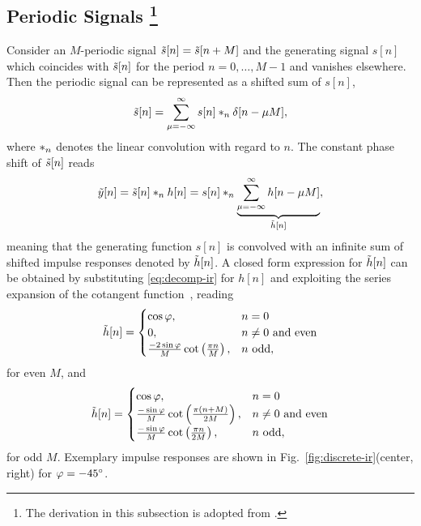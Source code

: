 \subsection[Periodic Signals]{Periodic Signals%
\footnote{The derivation in this subsection is adopted from
\cite[Sec.~1.9 and Sec.~4.6]{hahn1996hilbert}.}}
\label{sec:periodic-signals}
%
Consider an $M$-periodic signal $\tilde{s}[n] = \tilde{s}[n + M]$
and the generating signal $s[n]$ which coincides
with $\tilde{s}[n]$ for the period $n=0,\ldots,M\!-\!1$ and vanishes elsewhere.
Then the periodic signal can be represented as a shifted sum of $s[n]$,
\begin{align}
\speri[n] = \sum_{\mu=-\infty}^{\infty} s[n] \convn \delta[n-\mu M],
\label{eq:periodic-rep}
\end{align}
where $\ast_{n}$ denotes the linear convolution with regard to $n$.
The constant phase shift of $\tilde{s}[n]$ reads
\begin{align}
\yperi[n] = \speri[n] \convn h[n]
= s[n] \convn
\underbrace{\sum_{\mu=-\infty}^{\infty} h[n-\mu M]}_{\hperi[n]},
\label{eq:periodic-conv}
\end{align}
meaning that the generating function $s[n]$ is convolved with
an infinite sum of shifted impulse responses denoted by $\tilde{h}[n]$.
A closed form expression for $\tilde{h}[n]$ can be obtained by
substituting \eqref{eq:decomp-ir} for $h[n]$ and exploiting
the series expansion of the cotangent function~\cite[Eq.~(4.3.91)]{abramowitz},
reading
\begin{align}
\hperi[n]=
\begin{cases}
\cos\varphi,& n=0\\
0,& \text{$n\neq 0$ and even}\\
\frac{-2\sin\varphi}{M}\cot\left(\frac{\pi n}{M}\right),& \text{$n$ odd},
\end{cases}
\label{eq:hperi-even}
\end{align}
for even $M$, and
\begin{align}
\hperi[n]=
\begin{cases}
\cos\varphi,& n=0\\
\frac{-\sin\varphi}{M} \cot\left(\frac{\pi(n + M)}{2M}\right),& \text{$n\neq 0$ and even}\\
\frac{-\sin\varphi}{M} \cot\left(\frac{\pi n}{2M}\right),& \text{$n$ odd},
\end{cases}
\label{eq:hperi-odd}
\end{align}
for odd $M$.
Exemplary impulse responses are shown
in Fig.~\ref{fig:discrete-ir}(center, right) for $\varphi=-45\degree$.
